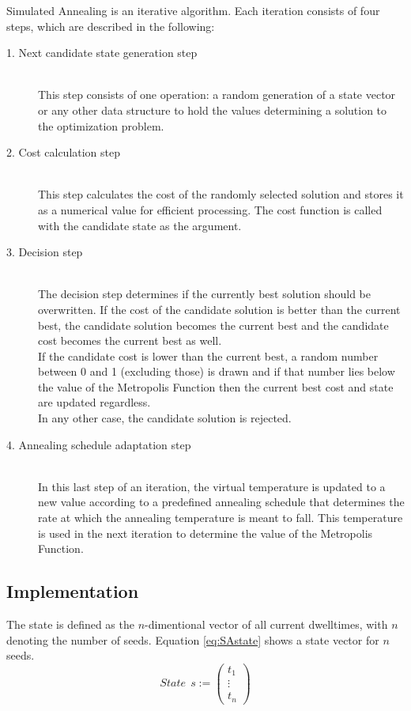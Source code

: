 \documentclass[12pt]{article}
\begin{document}
Simulated Annealing is an iterative algorithm. Each iteration consists of four steps, which are described in the following:                                                           

\begin{description}
\item[1. Next candidate state generation step]~\\
This step consists of one operation: a random generation of a state vector or any other data structure to hold the values determining a solution to the optimization problem.
\item[2. Cost calculation step]~\\
This step calculates the cost of the randomly selected solution and stores it as a numerical value for efficient processing. The cost function is called with the candidate state as the argument.
\item[3. Decision step]~\\
The decision step determines if the currently best solution should be overwritten. If the cost of the candidate solution is better than the current best, the candidate solution becomes the current best and the candidate cost becomes the current best as well. \\ If the candidate cost is lower than the current best, a random number between 0 and 1 (excluding those) is drawn and if that number lies below the value of the Metropolis Function then the current best cost and state are updated regardless. \\ In any other case, the candidate solution is rejected. 
\item[4. Annealing schedule adaptation step]~\\
In this last step of an iteration, the virtual temperature is updated to a new value according to a predefined annealing schedule that determines the rate at which the annealing temperature is meant to fall. This temperature is used in the next iteration to determine the value of the Metropolis Function.
\end{description} 

\subsection{Implementation}
\label{subsec:impl}
The state is defined as the $n$-dimentional vector of all current dwelltimes, with $n$ denoting the number of seeds. Equation \eqref{eq:SAstate} shows a state vector for $n$ seeds.
 \begin{equation}
 \label{eq:SAstate}
 State \ \ s := \begin{pmatrix}
 t_{1} \\ \vdots \\ t_{n} 	
\end{pmatrix}   
\end{equation} 
 
\end{document}
